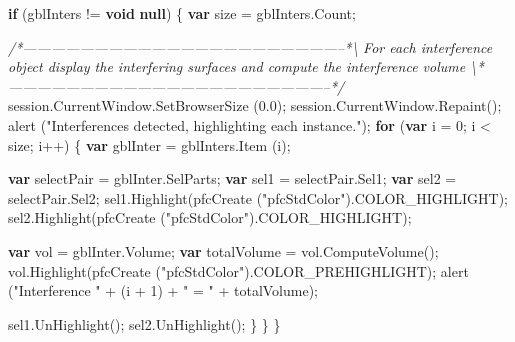 \documentclass[]{article}
\newenvironment{Shaded}{}{}
\newcommand{\KeywordTok}[1]{\textcolor[rgb]{0.00,0.44,0.13}{\textbf{{#1}}}}
\newcommand{\DecValTok}[1]{\textcolor[rgb]{0.25,0.63,0.44}{{#1}}}
\newcommand{\FloatTok}[1]{\textcolor[rgb]{0.25,0.63,0.44}{{#1}}}
\newcommand{\StringTok}[1]{\textcolor[rgb]{0.25,0.44,0.63}{{#1}}}
\newcommand{\CommentTok}[1]{\textcolor[rgb]{0.38,0.63,0.69}{\textit{{#1}}}}
\newcommand{\OtherTok}[1]{\textcolor[rgb]{0.00,0.44,0.13}{{#1}}}
\newcommand{\FunctionTok}[1]{\textcolor[rgb]{0.02,0.16,0.49}{{#1}}}
\newcommand{\NormalTok}[1]{{#1}}
\begin{document}
\begin{Shaded}
\begin{Highlighting}[]
  \KeywordTok{if} \NormalTok{(gblInters != }\KeywordTok{void} \KeywordTok{null}\NormalTok{)}
    \NormalTok{\{}
      \KeywordTok{var} \NormalTok{size = }\OtherTok{gblInters}\NormalTok{.}\FunctionTok{Count}\NormalTok{;}
      
\CommentTok{/*--------------------------------------------------------------------*\textbackslash{} }
\CommentTok{  For each interference object display the interfering surfaces}
\CommentTok{  and compute the interference volume}
\CommentTok{\textbackslash{}*--------------------------------------------------------------------*/}
      \OtherTok{session}\NormalTok{.}\OtherTok{CurrentWindow}\NormalTok{.}\FunctionTok{SetBrowserSize} \NormalTok{(}\FloatTok{0.0}\NormalTok{);}
      \OtherTok{session}\NormalTok{.}\OtherTok{CurrentWindow}\NormalTok{.}\FunctionTok{Repaint}\NormalTok{();}
      \FunctionTok{alert} \NormalTok{(}\StringTok{"Interferences detected, highlighting each instance."}\NormalTok{);}
      \KeywordTok{for} \NormalTok{(}\KeywordTok{var} \NormalTok{i = }\DecValTok{0}\NormalTok{; i < size; i++)}
    \NormalTok{\{}
      \KeywordTok{var} \NormalTok{gblInter = }\OtherTok{gblInters}\NormalTok{.}\FunctionTok{Item} \NormalTok{(i);}
      
      \KeywordTok{var} \NormalTok{selectPair = }\OtherTok{gblInter}\NormalTok{.}\FunctionTok{SelParts}\NormalTok{;}
      \KeywordTok{var} \NormalTok{sel1 = }\OtherTok{selectPair}\NormalTok{.}\FunctionTok{Sel1}\NormalTok{;}
      \KeywordTok{var} \NormalTok{sel2 = }\OtherTok{selectPair}\NormalTok{.}\FunctionTok{Sel2}\NormalTok{;}
      \OtherTok{sel1}\NormalTok{.}\FunctionTok{Highlight}\NormalTok{(}\FunctionTok{pfcCreate} \NormalTok{(}\StringTok{"pfcStdColor"}\NormalTok{).}\FunctionTok{COLOR_HIGHLIGHT}\NormalTok{);}
      \OtherTok{sel2}\NormalTok{.}\FunctionTok{Highlight}\NormalTok{(}\FunctionTok{pfcCreate} \NormalTok{(}\StringTok{"pfcStdColor"}\NormalTok{).}\FunctionTok{COLOR_HIGHLIGHT}\NormalTok{);}
      
      \KeywordTok{var} \NormalTok{vol = }\OtherTok{gblInter}\NormalTok{.}\FunctionTok{Volume}\NormalTok{;}
      \KeywordTok{var} \NormalTok{totalVolume = }\OtherTok{vol}\NormalTok{.}\FunctionTok{ComputeVolume}\NormalTok{();}
      \OtherTok{vol}\NormalTok{.}\FunctionTok{Highlight}\NormalTok{(}\FunctionTok{pfcCreate} \NormalTok{(}\StringTok{"pfcStdColor"}\NormalTok{).}\FunctionTok{COLOR_PREHIGHLIGHT}\NormalTok{);}
      \FunctionTok{alert} \NormalTok{(}\StringTok{"Interference "} \NormalTok{+ (i + }\DecValTok{1}\NormalTok{) + }\StringTok{" = "} \NormalTok{+ totalVolume);}
      
      \OtherTok{sel1}\NormalTok{.}\FunctionTok{UnHighlight}\NormalTok{();}
      \OtherTok{sel2}\NormalTok{.}\FunctionTok{UnHighlight}\NormalTok{();           }
    \NormalTok{\}}
    \NormalTok{\}}
\NormalTok{\}}
\end{Highlighting}
\end{Shaded}
\end{document}
